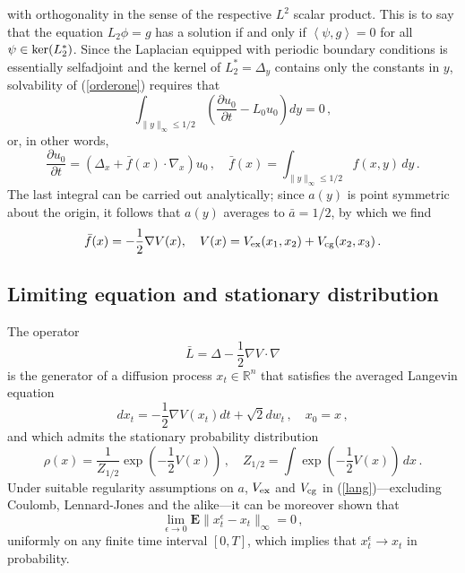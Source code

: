 \documentclass{amsart}
\newcommand{\R}{{\mathbb R}}
\newcommand{\bk}[2]{\left\langle #1,#2\right\rangle}
\newcommand{\bE}{{\mathbf E}}
\newcommand{\eps}{\epsilon}
\begin{document}
with orthogonality in the sense of the respective $L^{2}$ scalar product. This is to say that the equation $L_{2}\phi=g$ has a solution if and only if $\bk{\psi}{g}=0$ for all $\psi\in{\rm ker}(L^{*}_{2})$. Since the Laplacian equipped with periodic boundary conditions is essentially selfadjoint and the kernel of $L_{2}^{*}=\Delta_{y}$ contains only the constants in $y$, solvability of (\ref{orderone}) requires that 
\begin{equation*}
\int_{\|y\|_{\infty}\le 1/2} \left(\frac{\partial u_{0}}{\partial t} - L_{0}u_{0}\right)dy = 0\,,
\end{equation*}
or, in other words,
\begin{equation*}
\frac{\partial u_{0}}{\partial t} = \left(\Delta_{x} +  \bar{f}(x)\cdot\nabla_{x}\right) u_{0}\,,\quad \bar{f}(x) = \int_{\|y\|_{\infty}\le 1/2} f(x,y)\,dy\,.
\end{equation*}
The last integral can be carried out analytically; since $a(y)$ is point symmetric about the origin, it follows that $a(y)$ averages to $\bar{a}=1/2$, by which we find 
\begin{equation*}
\bar{f}(x) = - \frac{1}{2}\nabla V(x), \quad V(x) = V_{\rm ex}(x_{1},x_{2}) + V_{\rm cg}(x_{2},x_{3})\,.
\end{equation*}
\subsection{Limiting equation and stationary distribution}
The operator
\begin{equation*}
\bar{L} = \Delta - \frac{1}{2}\nabla V\cdot\nabla
\end{equation*}
is the generator of a diffusion process $x_{t}\in\R^{n}$ that satisfies the averaged Langevin equation
\begin{equation}\label{lang0}
dx_{t}  = -\frac{1}{2}\nabla V(x_{t})dt + \sqrt{2} dw_{t}\,,\quad x_{0}=x\,,
\end{equation}
and which admits the stationary probability distribution
\begin{equation*}
\rho(x) = \frac{1}{Z_{1/2}}\exp\left(-\frac{1}{2} V(x)\right)\,,\quad Z_{1/2}=\int\exp\left(-\frac{1}{2} V(x)\right)\,dx\,.
\end{equation*}
Under suitable regularity assumptions on $a$, $V_{\rm ex}$ and $V_{\rm cg}$ in (\ref{lang})---excluding Coulomb, Lennard-Jones and the alike---it can be moreover shown that 
\begin{equation*}
\lim_{\eps\to 0}\bE \|x_{t}^{\eps} - x_{t}\|_{\infty}= 0\,,
\end{equation*}
uniformly on any finite time interval $[0,T]$, which implies that $x_{t}^{\eps}\to x_{t}$ in probability. 
\end{document}
